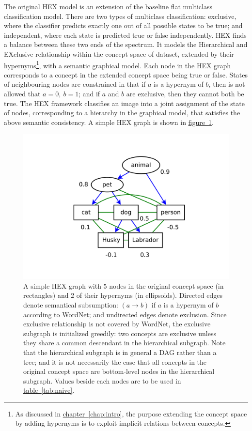 \documentclass[11pt,a4paper]{book}
\begin{document}
The original HEX model \cite{deng2014large} is an extension of the baseline flat multiclass classification model. There are two types of multiclass classification: exclusive, where the classifier predicts exactly one out of all possible states to be true; and independent, where each state is predicted true or false independently. HEX finds a balance between these two ends of the spectrum. It models the Hierarchical and EXclusive relationship within the concept space of dataset, extended by their hypernyms\footnote{As discussed in \hyperref[chap:intro]{chapter~\ref{chap:intro}}, the purpose extending the concept space by adding hypernyms is to exploit implicit relations between concepts.}, with a semantic graphical model. Each node in the HEX graph corresponds to a concept in the extended concept space being true or false. States of neighbouring nodes are constrained in that if $a$ is a hypernym of $b$, then is not allowed that $a=0,\ b=1$; and if $a$ and $b$ are exclusive, then they cannot both be true. The HEX framework classifies an image into a joint assignment of the state of nodes, corresponding to a hierarchy in the graphical model, that satisfies the above semantic consistency. A simple HEX graph is shown in \hyperref[fig:naive]{figure~\ref{fig:naive}}.
\begin{figure}[htbp]
\centering
\includegraphics[scale=0.5]{naive.pdf}
\caption{A simple HEX graph with 5 nodes in the original concept space (in rectangles) and 2 of their hypernyms (in ellipsoids). Directed edges denote semantical subsumption: $(a\rightarrow b)$ if $a$ is a hypernym of $b$ according to WordNet; and undirected edges denote exclusion. Since exclusive relationship is not covered by WordNet, the exclusive subgraph is initialized greedily: two concepts are exclusive unless they share a common descendant in the hierarchical subgraph. Note that the hierarchical subgraph is in general a DAG rather than a tree; and it is not necessarily the case that all concepts in the original concept space are bottom-level nodes in the hierarchical subgraph. Values beside each nodes are to be used in \hyperref[tab:naive]{table~\ref{tab:naive}}.}
\label{fig:naive}
\end{figure}
\end{document}
